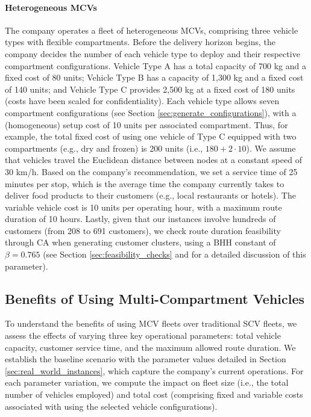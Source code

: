 \documentclass[11pt]{elsarticle}
\theoremstyle{plain}
\begin{document}
\paragraph{Heterogeneous \acp{MCV}}
The company operates a fleet of heterogeneous \acp{MCV}, comprising three vehicle types with flexible compartments.
Before the delivery horizon begins, the company decides the number of each vehicle type to deploy and their respective compartment configurations.
Vehicle Type A has a total capacity of 700 kg and a fixed cost of 80 units; Vehicle Type B has a capacity of 1,300 kg and a fixed cost of 140 units; and Vehicle Type C provides 2,500 kg at a fixed cost of 180 units (costs have been scaled for confidentiality).
Each vehicle type allows seven compartment configurations (see Section \ref{sec:generate_configurations}), with a (homogeneous) setup cost of 10 units per associated compartment. 
Thus, for example, the total fixed cost of using one vehicle of Type C equipped with two compartments (e.g., dry and frozen) is 200 units (i.e., $180 + 2\cdot10$).
We assume that vehicles travel the Euclidean distance between nodes at a constant speed of 30 km/h. Based on the company's recommendation, we set a service time of 25 minutes per stop, which is the average time the company currently takes to deliver food products to their customers (e.g., local restaurants or hotels). The variable vehicle cost is 10 units per operating hour, with a maximum route duration of 10 hours. Lastly, given that our instances involve hundreds of customers (from 208 to 691 customers), we check route duration feasibility through \ac{CA} when generating customer clusters, using a \ac{BHH} constant of $\beta = 0.765$ (see Section \ref{sec:feasibility_checks} and \cite{carlsson2025new} for a detailed discussion of this parameter). 

\subsection{Benefits of Using Multi-Compartment Vehicles}

To understand the benefits of using \ac{MCV} fleets over traditional \ac{SCV} fleets, we assess the effects of varying three key operational parameters: total vehicle capacity, customer service time, and the maximum allowed route duration. We establish the baseline scenario with the parameter values detailed in Section \ref{sec:real_world_instances}, which capture the company’s current operations. For each parameter variation, we compute the impact on fleet size (i.e., the total number of vehicles employed) and total cost (comprising fixed and variable costs associated with using the selected vehicle configurations).
\end{document}
